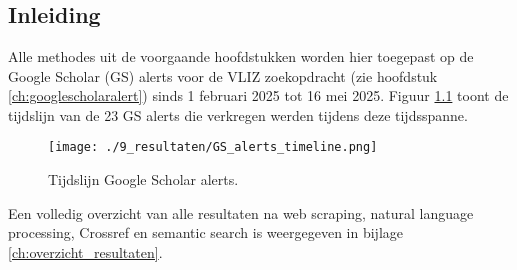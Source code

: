 
\chapter{}%
\label{ch:resultaten}

\section{Inleiding}
Alle methodes uit de voorgaande hoofdstukken worden hier toegepast op de Google Scholar (GS) alerts voor de VLIZ zoekopdracht (zie hoofdstuk \ref{ch:googlescholaralert}) sinds 1 februari 2025 tot 16 mei 2025.
Figuur \ref{fig:GSAlertsTimeline} toont de tijdslijn van de 23 GS alerts die verkregen werden tijdens deze tijdsspanne.
\begin{figure}[h!]
    \centering
    \texttt{[image: ./9\_resultaten/GS\_alerts\_timeline.png]}
    \caption[Tijdslijn Google Scholar alerts.]{\label{fig:GSAlertsTimeline}Tijdslijn Google Scholar alerts.}
\end{figure}
Een volledig overzicht van alle resultaten na web scraping, natural language processing, Crossref en semantic search is weergegeven in bijlage \ref{ch:overzicht_resultaten}.

